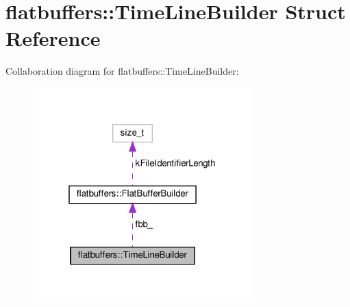 \hypertarget{structflatbuffers_1_1TimeLineBuilder}{}\section{flatbuffers\+:\+:Time\+Line\+Builder Struct Reference}
\label{structflatbuffers_1_1TimeLineBuilder}


Collaboration diagram for flatbuffers\+:\+:Time\+Line\+Builder\+:
\nopagebreak
\begin{figure}[H]
\begin{center}
\leavevmode
\includegraphics[width=241pt]{structflatbuffers_1_1TimeLineBuilder__coll__graph}
\end{center}
\end{figure}
